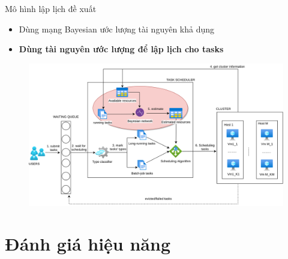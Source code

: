 \documentclass[11pt,xcolor={dvipsnames}, aspectratio=169]{beamer}
\begin{document}
\begin{frame}
{Mô hình lập lịch đề xuất}
	\begin{minipage}[t]{0.39\linewidth}
		\vspace{2cm}
		\begin{itemize}
			\item Dùng mạng Bayesian ước lượng tài nguyên khả dụng 
			\item \textbf{Dùng tài nguyên ước lượng để lập lịch cho tasks}
		\end{itemize}
	\end{minipage}
	\hfill
	\begin{minipage}[t]{0.6\linewidth}
	\vspace{0.5cm}
		\begin{figure}
			\centering
			\includegraphics[scale=0.35]{images/bayesian_application.png}		
		\end{figure}			
	\end{minipage}
\end{frame}

\section{Đánh giá hiệu năng} 
\end{document}

